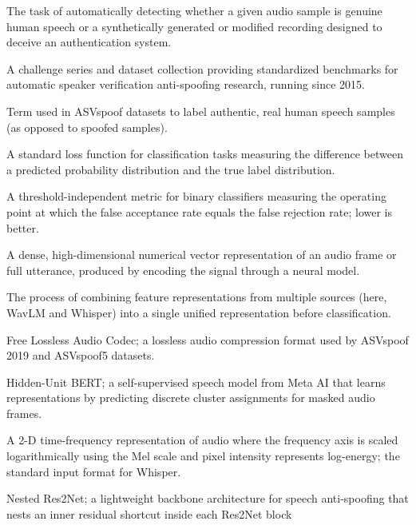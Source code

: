 \documentclass[11pt,a4paper]{article}
\begin{document}
\begin{description}[style=nextline, leftmargin=3.5cm, labelwidth=3.3cm,
                    font=\normalfont\bfseries]
  \item[Anti-spoofing] The task of automatically detecting whether a given audio
    sample is genuine human speech or a synthetically generated or modified
    recording designed to deceive an authentication system.
  \item[ASVspoof] A challenge series and dataset collection providing standardized
    benchmarks for automatic speaker verification anti-spoofing research, running
    since 2015.
  \item[Bonafide] Term used in ASVspoof datasets to label authentic, real human
    speech samples (as opposed to spoofed samples).
  \item[Cross-Entropy Loss] A standard loss function for classification tasks
    measuring the difference between a predicted probability distribution and the
    true label distribution.
  \item[EER (Equal Error Rate)] A threshold-independent metric for binary
    classifiers measuring the operating point at which the false acceptance rate
    equals the false rejection rate; lower is better.
  \item[Embedding] A dense, high-dimensional numerical vector representation of an
    audio frame or full utterance, produced by encoding the signal through a neural
    model.
  \item[Feature Fusion] The process of combining feature representations from
    multiple sources (here, WavLM and Whisper) into a single unified representation
    before classification.
  \item[FLAC] Free Lossless Audio Codec; a lossless audio compression format used
    by ASVspoof 2019 and ASVspoof5 datasets.
  \item[HuBERT] Hidden-Unit BERT; a self-supervised speech model from Meta AI that
    learns representations by predicting discrete cluster assignments for masked
    audio frames.
  \item[Log-Mel Spectrogram] A 2-D time-frequency representation of audio where
    the frequency axis is scaled logarithmically using the Mel scale and pixel
    intensity represents log-energy; the standard input format for Whisper.
  \item[Nes2Net] Nested Res2Net; a lightweight backbone architecture for speech
    anti-spoofing that nests an inner residual shortcut inside each Res2Net block

\end{description}
\end{document}
